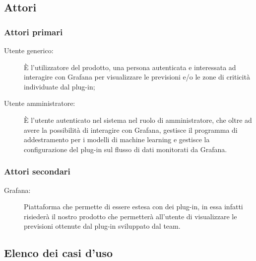 \documentclass[../analisi-dei-requisiti.tex]{subfiles}
\begin{document}
\subsection{Attori}
\label{subs:attori}

\subsubsection{Attori primari}
\label{sssec:attori_primari}
\begin{description}
  \item[Utente generico:] È l'utilizzatore del prodotto, una persona autenticata e interessata ad interagire con Grafana per visualizzare le previsioni e/o le zone di criticità individuate dal plug-in;
  \item[Utente amministratore:] È l'utente autenticato nel sistema nel ruolo di amministratore, che oltre ad avere la possibilità di interagire con Grafana, gestisce il programma di addestramento per i modelli di machine learning e gestisce la configurazione del plug-in sul flusso di dati monitorati da Grafana.
\end{description}

\subsubsection{Attori secondari}
\label{sssec:attori_secondari}
\begin{description}
  \item[Grafana:] Piattaforma che permette di essere estesa con dei plug-in, in essa infatti risiederà il nostro prodotto che permetterà all'utente di visualizzare le previsioni ottenute dal plug-in sviluppato dal team.
\end{description}

\subsection{Elenco dei casi d'uso}
\label{subs:elenco_dei_casi_duso}
































\end{document}
